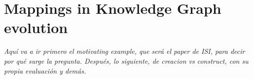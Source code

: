 
\chapter{Mappings in Knowledge Graph evolution}
\label{chapter:reframing}

\textit{Aquí va a ir primero el motivating example, que será el paper de ISI, para decir por qué surge la pregunta. Después, lo siguiente, de creacion vs construct, con su propia evaluación y demás.}

